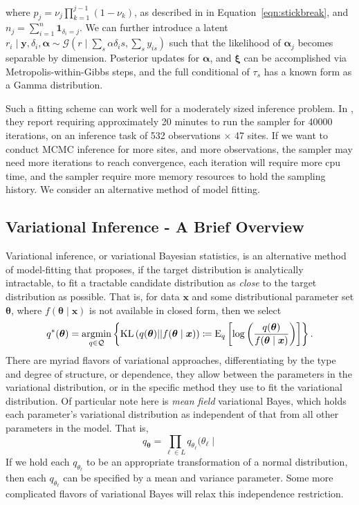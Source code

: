     where $p_j = \nu_j\prod_{k=1}^{j-1}(1 - \nu_k)$,  as described in in 
    Equation~\eqref{eqn:stickbreak}, and $n_j = \sum_{i = 1}^n\bm{1}_{\delta_i = j}$.
    We can further introduce a latent $r_i\mid \bm{y}, \delta_i,\bm{\alpha} \sim 
        \mathcal{G}\left(r\mid \sum_s \alpha{\delta_is},\sum_s y_{is}\right)$ such that the
    likelihood of $\bm{\alpha}_j$ becomes separable by dimension.  Posterior updates 
    for $\bm{\alpha}$, and $\bm{\xi}$ can be accomplished via Metropolis-within-Gibbs steps,
    and the full conditional of $\tau_s$ has a known form as a Gamma distribution.

Such a fitting scheme can work well for a moderately sized inference problem.  In \cite{trubey:pg},
    they report requiring approximately \num{20} minutes to run the sampler for \num{40000} iterations, 
    on an inference task of \num{532} observations $\times$ \num{47} sites.  If we want to conduct
    MCMC inference for more sites, and more observations, the sampler may need more iterations to
    reach convergence, each iteration will require more cpu time, and the sampler require more 
    memory resources to hold the sampling history.  We consider an alternative method of model fitting.

\subsection{Variational Inference - A Brief Overview}
Variational inference, or variational Bayesian statistics, is an alternative method of 
    model-fitting that proposes, if the target distribution is analytically intractable,
    to fit a tractable candidate distribution as \emph{close} to the target distribution
    as possible.  That is, for data $\bm{x}$ and some distributional parameter set $\bm{\theta}$,
    where $f(\bm{\theta}\mid \bm{x})$ is not available in closed form, then we select
    \begin{equation}
        \label{eqn:optimalq}
        q^*(\bm{\theta}) = \operatorname*{argmin}_{q\in\mathcal{Q}}\left\lbrace
        \text{KL}\left(q(\bm{\theta})||f(\bm{\theta}\mid\bm{x})\right) 
        \coloneqq
        \text{E}_{q}\left[\log\left(
        \frac{q(\bm{\theta})}{f(\bm{\theta}\mid\bm{x})}
        \right)\right]
        \right\rbrace.
    \end{equation}
    There are myriad flavors of variational approaches, differentiating by
    the type and degree of structure, or dependence, they allow between the parameters in
    the variational distribution, or in the specific method they use to fit the variational
    distribution.  Of particular note here is \emph{mean field} variational Bayes, which 
    holds each parameter's variational distribution as independent of that from all other 
    parameters in the model.  That is,
    \[
        q_{\bm{\theta}} = \prod_{\ell \in L}q_{\theta_{\ell}}(\theta_{\ell}\mid
    \]
    If we hold each $q_{\theta_{\ell}}$ to be an appropriate transformation of a normal
    distribution, then each $q_{\theta_{\ell}}$ can be specified by a mean and variance 
    parameter. Some \needcite more complicated flavors of variational Bayes will relax 
    this independence restriction.

